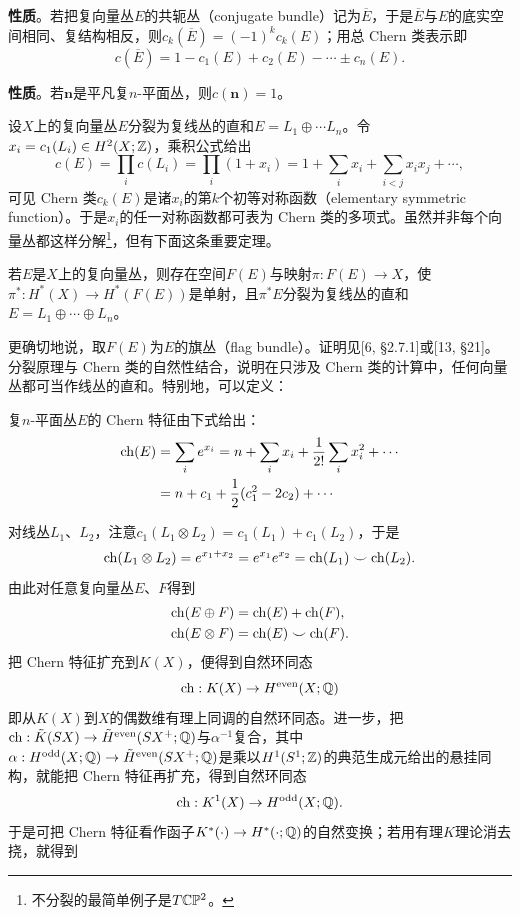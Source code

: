 \noindent\textbf{性质}。若把复向量丛$E$的共轭丛（conjugate bundle）记为$\overline{E}$，于是$\overline{E}$与$E$的底实空间相同、复结构相反，则$c_k(\overline{E})=(-1)^kc_k(E)$；用总 Chern 类表示即
\[
c(\overline{E})=1-c_1(E)+c_2(E)-\cdots\pm c_n(E).
\]

\noindent\textbf{性质}。若$\mathbf{n}$是平凡复$n$-平面丛，则$c(\mathbf{n})=1$。

设$X$上的复向量丛$E$分裂为复线丛的直和$E=L_1\oplus\cdots L_n$。令$x_i=c_1(L_i)\in H^2(X;\mathbb{Z})$，乘积公式给出
\[
c(E)=\prod_i c(L_i)=\prod_i(1+x_i)=1+\sum_i x_i+\sum_{i<j}x_ix_j+\cdots,
\]
可见 Chern 类$c_k(E)$是诸$x_i$的第$k$个初等对称函数（elementary symmetric function）。于是$x_i$的任一对称函数都可表为 Chern 类的多项式。虽然并非每个向量丛都这样分解\footnote{不分裂的最简单例子是$T\mathbb{C}\mathbb{P}^2$。}，但有下面这条重要定理。

\begin{theorem}[分裂原理]
若$E$是$X$上的复向量丛，则存在空间$F(E)$与映射$\pi:F(E)\to X$，使$\pi^*:H^*(X)\to H^*(F(E))$是单射，且$\pi^*E$分裂为复线丛的直和$E=L_1\oplus\cdots\oplus L_n$。
\end{theorem}

更确切地说，取$F(E)$为$E$的旗丛（flag bundle）。证明见[6, §2.7.1]或[13, §21]。分裂原理与 Chern 类的自然性结合，说明在只涉及 Chern 类的计算中，任何向量丛都可当作线丛的直和。特别地，可以定义：

\begin{definition}
复$n$-平面丛$E$的 Chern 特征由下式给出：
\begin{align*}
\operatorname{ch}(E)&=\sum_i e^{x_i}=n+\sum_i x_i+\frac{1}{2!}\sum_i x_i^2+\cdots\\
&=n+c_1+\frac12(c_1^2-2c_2)+\cdots
\end{align*}
\end{definition}


对线丛$L_1$、$L_2$，注意$c_1(L_1\otimes L_2)=c_1(L_1)+c_1(L_2)$，于是
\[
\operatorname{ch}(L_1\otimes L_2)=e^{x_1+x_2}=e^{x_1}e^{x_2}=\operatorname{ch}(L_1)\smile\operatorname{ch}(L_2).
\]
由此对任意复向量丛$E$、$F$得到
\begin{align*}
\operatorname{ch}(E\oplus F)&=\operatorname{ch}(E)+\operatorname{ch}(F),\\
\operatorname{ch}(E\otimes F)&=\operatorname{ch}(E)\smile\operatorname{ch}(F).
\end{align*}
把 Chern 特征扩充到$K(X)$，便得到自然环同态
\[
\operatorname{ch}:K(X)\to H^{\mathrm{even}}(X;\mathbb{Q})
\]
即从$K(X)$到$X$的偶数维有理上同调的自然环同态。进一步，把$\operatorname{ch}:\tilde K(SX)\to\tilde H^{\mathrm{even}}(SX^+;\mathbb{Q})$与$\alpha^{-1}$复合，其中$\alpha:H^{\mathrm{odd}}(X;\mathbb{Q})\to\tilde H^{\mathrm{even}}(SX^+;\mathbb{Q})$是乘以$H^1(S^1;\mathbb{Z})$的典范生成元给出的悬挂同构，就能把 Chern 特征再扩充，得到自然环同态
\[
\operatorname{ch}:K^1(X)\to H^{\mathrm{odd}}(X;\mathbb{Q}).
\]
于是可把 Chern 特征看作函子$K^*(\cdot)\to H^*(\cdot;\mathbb{Q})$的自然变换；若用有理$K$理论消去挠，就得到

